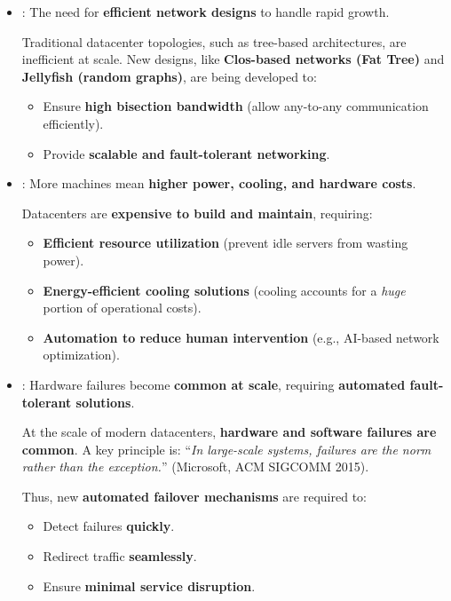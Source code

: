 \begin{itemize}
    \item {}: The need for \textbf{efficient network designs} to handle rapid growth.
    
    Traditional datacenter topologies, such as tree-based architectures, are inefficient at scale. New designs, like \textbf{Clos-based networks (Fat Tree)} and \textbf{Jellyfish (random graphs)}, are being developed to:
    \begin{itemize}[label=\textcolor{Green3}{}]
        \item Ensure \textbf{high bisection bandwidth} (allow any-to-any communication efficiently).
        \item Provide \textbf{scalable and fault-tolerant networking}.
    \end{itemize}
    
    \newpage

    \item {}: More machines mean \textbf{higher power, cooling, and hardware costs}.
    
    Datacenters are \textbf{expensive to build and maintain}, requiring:
    \begin{itemize}
        \item \textbf{Efficient resource utilization} (prevent idle servers from wasting power).
        \item \textbf{Energy-efficient cooling solutions} (cooling accounts for a \emph{huge} portion of operational costs).
        \item \textbf{Automation to reduce human intervention} (e.g., AI-based network optimization).
    \end{itemize}
    
    
    \item {}: Hardware failures become \textbf{common at scale}, requiring \textbf{automated fault-tolerant solutions}.
    
    At the scale of modern datacenters, \textbf{hardware and software failures are common}. A key principle is: ``\emph{In large-scale systems, failures are the norm rather than the exception.}'' (Microsoft, ACM SIGCOMM 2015).

    Thus, new \textbf{automated failover mechanisms} are required to:
    \begin{itemize}
        \item Detect failures \textbf{quickly}.
        \item Redirect traffic \textbf{seamlessly}.
        \item Ensure \textbf{minimal service disruption}.
    \end{itemize}


\end{itemize}
